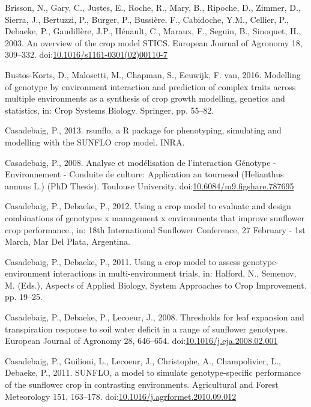 \documentclass[a4paper]{article}
\begin{document}
\hypertarget{ref-Brisson2003}{}
Brisson, N., Gary, C., Justes, E., Roche, R., Mary, B., Ripoche, D.,
Zimmer, D., Sierra, J., Bertuzzi, P., Burger, P., Bussière, F.,
Cabidoche, Y.M., Cellier, P., Debaeke, P., Gaudillère, J.P., Hénault,
C., Maraux, F., Seguin, B., Sinoquet, H., 2003. An overview of the crop
model STICS. European Journal of Agronomy 18, 309--332.
doi:\href{https://doi.org/10.1016/s1161-0301(02)00110-7}{10.1016/s1161-0301(02)00110-7}

\hypertarget{ref-Bustos-Korts2016}{}
Bustos-Korts, D., Malosetti, M., Chapman, S., Eeuwijk, F. van, 2016.
Modelling of genotype by environment interaction and prediction of
complex traits across multiple environments as a synthesis of crop
growth modelling, genetics and statistics, in: Crop Systems Biology.
Springer, pp. 55--82.

\hypertarget{ref-Casadebaig2013}{}
Casadebaig, P., 2013. rsunflo, a R package for phenotyping, simulating
and modelling with the SUNFLO crop model. INRA.

\hypertarget{ref-Casadebaig2008b}{}
Casadebaig, P., 2008. Analyse et modélisation de l'interaction Génotype
- Environnement - Conduite de culture: Application au tournesol
(Helianthus annuus L.) (PhD Thesis). Toulouse University.
doi:\href{https://doi.org/10.6084/m9.figshare.787695}{10.6084/m9.figshare.787695}

\hypertarget{ref-Casadebaig2012b}{}
Casadebaig, P., Debaeke, P., 2012. Using a crop model to evaluate and
design combinations of genotypes x management x environments that
improve sunflower crop performance., in: 18th International Sunflower
Conference, 27 February - 1st March, Mar Del Plata, Argentina.

\hypertarget{ref-Casadebaig2011a}{}
Casadebaig, P., Debaeke, P., 2011. Using a crop model to assess
genotype-environment interactions in multi-environment trials, in:
Halford, N., Semenov, M. (Eds.), Aspects of Applied Biology, System
Approaches to Crop Improvement. pp. 19--25.

\hypertarget{ref-Casadebaig2008}{}
Casadebaig, P., Debaeke, P., Lecoeur, J., 2008. Thresholds for leaf
expansion and transpiration response to soil water deficit in a range of
sunflower genotypes. European Journal of Agronomy 28, 646--654.
doi:\href{https://doi.org/10.1016/j.eja.2008.02.001}{10.1016/j.eja.2008.02.001}

\hypertarget{ref-Casadebaig2011}{}
Casadebaig, P., Guilioni, L., Lecoeur, J., Christophe, A., Champolivier,
L., Debaeke, P., 2011. SUNFLO, a model to simulate genotype-specific
performance of the sunflower crop in contrasting environments.
Agricultural and Forest Meteorology 151, 163--178.
doi:\href{https://doi.org/10.1016/j.agrformet.2010.09.012}{10.1016/j.agrformet.2010.09.012}
\end{document}
